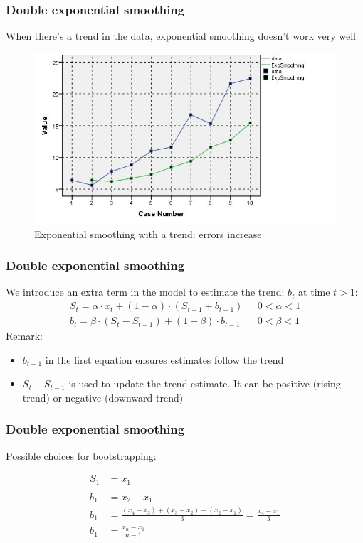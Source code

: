 \documentclass{beamer}
\begin{document}
\begin{frame}
  \frametitle{Double exponential smoothing}

  When there's a trend in the data, exponential smoothing doesn't work very well
  
  \begin{figure}
    \centering
    \includegraphics[width=.7\textwidth]{img/tijdreeks61}
    \caption{Exponential smoothing with a trend: errors increase}
    \label{fig:tijdreeks61}
  \end{figure}

\end{frame}


\begin{frame}
  \frametitle{Double exponential smoothing}
  
  We introduce an extra term in the model to estimate the trend: $b_t$ at time $t > 1$:
\begin{eqnarray}
  S_{t} = \alpha \cdot x_{t} + (1-\alpha) \cdot (S_{t-1} + b_{t-1}) & ~~~0 < \alpha < 1 \\
  b_{t} = \beta \cdot (S_{t}-S_{t-1}) + (1-\beta) \cdot b_{t-1}     & ~~~0 < \beta < 1 
\label{eq:doubleSmoothing}
\end{eqnarray}
\vfill
Remark:
  \begin{itemize}
    \item $ b_{t-1}$ in the first equation ensures estimates follow the trend
    \item $S_{t}-S_{t-1}$ is used to update the trend estimate. It can be positive (rising trend) or negative (downward trend)
  \end{itemize}
\end{frame}

\begin{frame}
  \frametitle{Double exponential smoothing}
  
  Possible choices for bootstrapping:
  
\begin{align*}
  S_{1} & = x_{1} \\
  \\
  b_{1} & = x_{2} - x_{1} \\
  b_{1} & = \frac{ (x_{4} - x_{3}) + (x_{3} - x_{2}) + (x_{2} - x_{1}) }{3} = \frac{x_4-x_1}{3} \\
  b_{1} & = \frac{x_{n} - x_{1}}{n-1} \\
\end{align*}

\end{frame}
\end{document}
